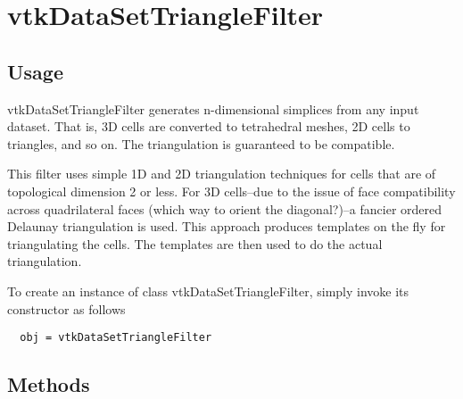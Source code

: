 \section{vtkDataSetTriangleFilter}

\subsection{Usage}

 vtkDataSetTriangleFilter generates n-dimensional simplices from any input
 dataset. That is, 3D cells are converted to tetrahedral meshes, 2D cells
 to triangles, and so on. The triangulation is guaranteed to be compatible.

 This filter uses simple 1D and 2D triangulation techniques for cells
 that are of topological dimension 2 or less. For 3D cells--due to the
 issue of face compatibility across quadrilateral faces (which way to
 orient the diagonal?)--a fancier ordered Delaunay triangulation is used.
 This approach produces templates on the fly for triangulating the
 cells. The templates are then used to do the actual triangulation.


To create an instance of class vtkDataSetTriangleFilter, simply
invoke its constructor as follows
\begin{verbatim}
  obj = vtkDataSetTriangleFilter
\end{verbatim}
\subsection{Methods}

